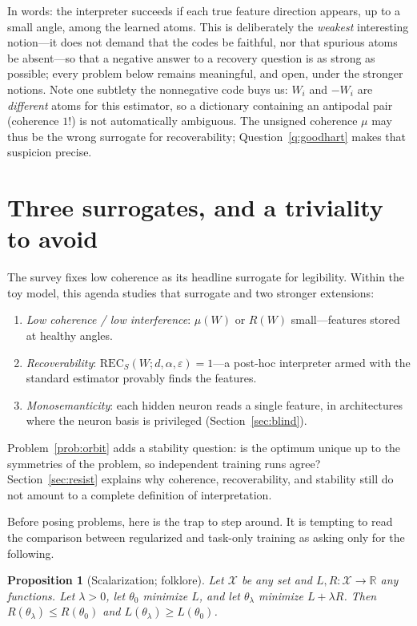 \documentclass[11pt]{amsart}
\theoremstyle{plain}
\newtheorem{proposition}[theorem]{Proposition}
\theoremstyle{definition}
\newcommand{\R}{\mathbb{R}}
\begin{document}
In words: the interpreter succeeds if each true feature direction appears, up to a small angle, among the learned atoms. This is deliberately the \emph{weakest} interesting notion---it does not demand that the codes be faithful, nor that spurious atoms be absent---so that a negative answer to a recovery question is as strong as possible; every problem below remains meaningful, and open, under the stronger notions. Note one subtlety the nonnegative code buys us: $W_i$ and $-W_i$ are \emph{different} atoms for this estimator, so a dictionary containing an antipodal pair (coherence $1$!) is not automatically ambiguous. The unsigned coherence $\mu$ may thus be the wrong surrogate for recoverability; Question~\ref{q:goodhart} makes that suspicion precise.

\section{Three surrogates, and a triviality to avoid}\label{sec:surrogates}

The survey fixes low coherence as its headline surrogate for legibility. Within the toy model, this agenda studies that surrogate and two stronger extensions:

\begin{enumerate}
\item[(S1)] \emph{Low coherence / low interference}: $\mu(W)$ or $R(W)$ small---features stored at healthy angles.
\item[(S2)] \emph{Recoverability}: $\mathrm{REC}_S(W;d,\alpha,\varepsilon)=1$---a post-hoc interpreter armed with the standard estimator provably finds the features.
\item[(S3)] \emph{Monosemanticity}: each hidden neuron reads a single feature, in architectures where the neuron basis is privileged (Section~\ref{sec:blind}).
\end{enumerate}
Problem~\ref{prob:orbit} adds a stability question: is the optimum unique up to the symmetries of the problem, so independent training runs agree? Section~\ref{sec:resist} explains why coherence, recoverability, and stability still do not amount to a complete definition of interpretation.

Before posing problems, here is the trap to step around. It is tempting to read the comparison between regularized and task-only training as asking only for the following.

\begin{proposition}[Scalarization; folklore]\label{prop:scalar}
Let $\mathcal X$ be any set and $L,R:\mathcal X\to\R$ any functions. Let $\lambda>0$, let $\theta_0$ minimize $L$, and let $\theta_\lambda$ minimize $L+\lambda R$. Then $R(\theta_\lambda)\le R(\theta_0)$ and $L(\theta_\lambda)\ge L(\theta_0)$.
\end{proposition}
\end{document}
